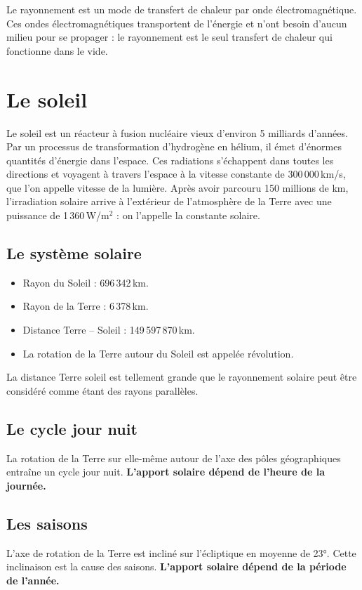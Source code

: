 Le rayonnement est un mode de transfert de chaleur par onde électromagnétique. Ces ondes électromagnétiques transportent de l’énergie et n'ont besoin d'aucun milieu pour se propager : le rayonnement est le seul transfert de chaleur qui fonctionne dans le vide.

\section{Le soleil}

Le soleil est un réacteur à fusion nucléaire vieux d’environ 5 milliards d'années. Par un processus de transformation d'hydrogène en hélium, il émet d'énormes quantités d'énergie dans l'espace. Ces radiations s'échappent dans toutes les directions et voyagent à travers l'espace à la vitesse constante de 300\,000\,km/s, que l'on appelle vitesse de la lumière. Après avoir parcouru 150 millions de km, l'irradiation solaire arrive à l'extérieur de l'atmosphère de la Terre avec une puissance de 1\,360\,W/m$^2$ : on l'appelle la constante solaire.

\subsection*{Le système solaire}
\begin{itemize}
  \item Rayon du Soleil : 696\,342\,km.
  \item Rayon de la Terre : 6\,378\,km.
  \item Distance Terre -- Soleil : 149\,597\,870\,km.
  \item La rotation de la Terre autour du Soleil est appelée révolution.
\end{itemize}
La distance Terre soleil est tellement grande que le rayonnement solaire peut être considéré comme étant des rayons parallèles.

\subsection*{Le cycle jour nuit}
La rotation de la Terre sur elle-même autour de l'axe des pôles géographiques entraîne un cycle jour nuit. \textbf{L'apport solaire dépend de l'heure de la journée.}

\subsection*{Les saisons}
L'axe de rotation de la Terre est incliné sur l'écliptique en moyenne de 23°. Cette inclinaison est la cause des saisons. \textbf{L'apport solaire dépend de la période de l'année.}

